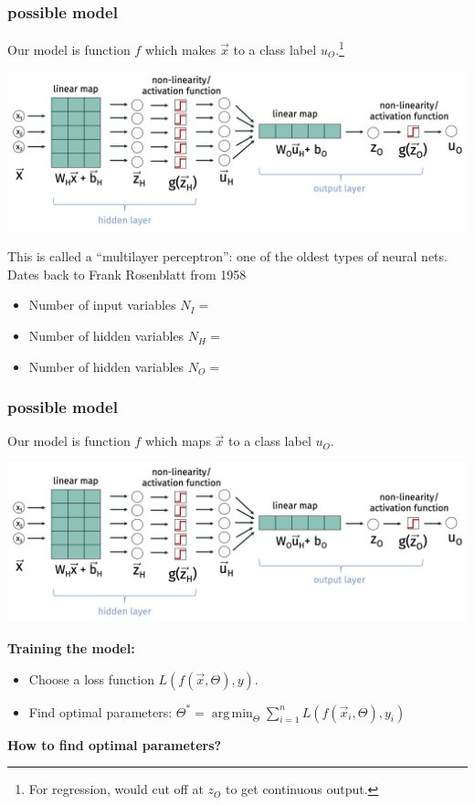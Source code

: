 \documentclass[handout,compress]{beamer}
\DeclareMathOperator*{\argmin}{arg\,min}
\begin{document}
\begin{frame}
	\frametitle{possible model}
	Our model is  function $f$ which makes $\vec{x}$ to a class label $u_O$.\footnote{For {regression}, would cut off at $z_O$ to get continuous output.}

	\begin{center}
		\includegraphics[width=\textwidth]{model_diagram.png}
		
		\vspace{-.5em}
		This is called a ``multilayer perceptron'': one of the oldest types of neural nets. Dates back to Frank Rosenblatt from 1958
	\end{center}	
\vspace{-1em}

\begin{itemize}
	\item Number of input variables $N_I = $
	\item Number of hidden variables $N_H = $
	\item Number of hidden variables $N_O = $
\end{itemize}
	\vspace{.5em}

\end{frame}

\begin{frame}
	\frametitle{possible model}
	Our model is  function $f$ which maps $\vec{x}$ to a class label $u_O$.
	\begin{center}
		\includegraphics[width=\textwidth]{model_diagram.png}
	\end{center}
	\textbf{Training the model:}
	\begin{itemize}
		\item Choose a loss function $L(f(\vec{x}, \Theta), y)$.
		\item Find optimal parameters: $\Theta^* = \argmin_\Theta \sum_{i=1}^n L(f(\vec{x}_i, \Theta), y_i)$
	\end{itemize}
	\begin{center}
		\alert{\textbf{How to find optimal parameters?}}
	\end{center}
\end{frame}
\end{document}

